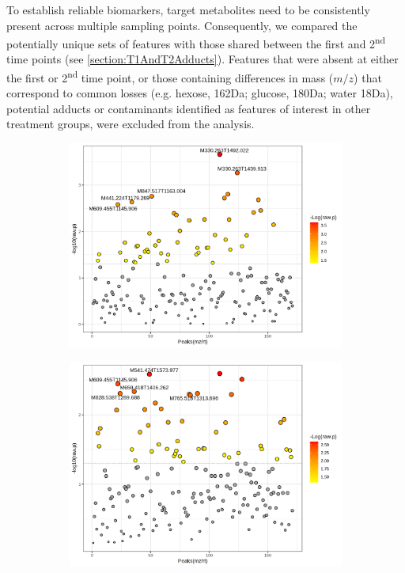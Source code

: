 To establish reliable biomarkers, target metabolites need to be consistently present across multiple sampling points. Consequently, we compared the potentially unique sets of features with those shared between the first and 2\textsuperscript{nd} time points (see \ref{section:T1AndT2Adducts}). Features that were absent at either the first or 2\textsuperscript{nd} time point, or those containing differences in mass ($m/z$) that correspond to common losses (e.g. hexose, 162Da; glucose, 180Da; water 18Da), potential adducts or contaminants identified as features of interest in other treatment groups, were excluded from the analysis.

\begin{figure}[hp!]
  \centering
  \begin{subfigure}[b]{0.49\textwidth}
    \includegraphics[width=\textwidth]{Figures/Sig171FeaturesRedGroupsDroVsConSecondTimePoint_t-test.png}
    \caption{}
    \label{fig:DroVsCon_t-test}
  \end{subfigure}
  \begin{subfigure}[b]{0.49\textwidth}
    \includegraphics[width=\textwidth]{Figures/Sig171FeaturesRedSamplesXvmVsConSecondTimePoint_t_test.png}

\end{subfigure}
\end{figure}

